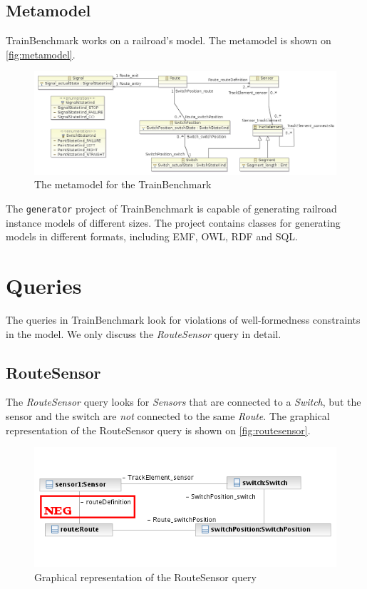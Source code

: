\subsection{Metamodel}

TrainBenchmark works on a railroad's model. The metamodel is shown on \autoref{fig:metamodel}.

\begin{figure}
\begin{center}
\includegraphics[width=14cm]{figures/TrainMetamodel}
\caption{The metamodel for the TrainBenchmark}
\label{fig:metamodel}
\end{center}
\end{figure}

The \texttt{generator} project of TrainBenchmark is capable of generating railroad instance models of different sizes. The project contains classes for generating models in different formats, including EMF, OWL, RDF and SQL.

\section{Queries}

The queries in TrainBenchmark look for violations of well-formedness constraints in the model. We only discuss the \textit{RouteSensor} query in detail.

\subsection{RouteSensor}

The \textit{RouteSensor} query looks for \textit{Sensors} that are connected to a \textit{Switch}, but the sensor and the switch are \textit{not} connected to the same \textit{Route}. The graphical representation of the RouteSensor query is shown on \autoref{fig:routesensor}.

\begin{figure}
\begin{center}
\includegraphics[]{figures/OD_RouteSensor}
\caption{Graphical representation of the RouteSensor query}
\label{fig:routesensor}
\end{center}
\end{figure}

